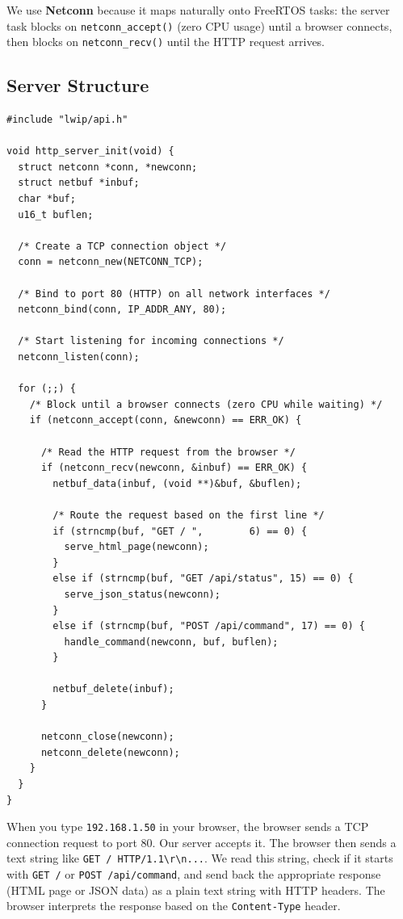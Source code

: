 \documentclass[11pt,a4paper]{article}
\begin{document}
We use \textbf{Netconn} because it maps naturally onto FreeRTOS tasks: the server task blocks on \texttt{netconn\_accept()} (zero CPU usage) until a browser connects, then blocks on \texttt{netconn\_recv()} until the HTTP request arrives.

\subsection{Server Structure}

\begin{lstlisting}
#include "lwip/api.h"

void http_server_init(void) {
  struct netconn *conn, *newconn;
  struct netbuf *inbuf;
  char *buf;
  u16_t buflen;

  /* Create a TCP connection object */
  conn = netconn_new(NETCONN_TCP);

  /* Bind to port 80 (HTTP) on all network interfaces */
  netconn_bind(conn, IP_ADDR_ANY, 80);

  /* Start listening for incoming connections */
  netconn_listen(conn);

  for (;;) {
    /* Block until a browser connects (zero CPU while waiting) */
    if (netconn_accept(conn, &newconn) == ERR_OK) {

      /* Read the HTTP request from the browser */
      if (netconn_recv(newconn, &inbuf) == ERR_OK) {
        netbuf_data(inbuf, (void **)&buf, &buflen);

        /* Route the request based on the first line */
        if (strncmp(buf, "GET / ",        6) == 0) {
          serve_html_page(newconn);
        }
        else if (strncmp(buf, "GET /api/status", 15) == 0) {
          serve_json_status(newconn);
        }
        else if (strncmp(buf, "POST /api/command", 17) == 0) {
          handle_command(newconn, buf, buflen);
        }

        netbuf_delete(inbuf);
      }

      netconn_close(newconn);
      netconn_delete(newconn);
    }
  }
}
\end{lstlisting}

\begin{infobox}
When you type \texttt{192.168.1.50} in your browser, the browser sends a TCP connection request to port 80. Our server accepts it. The browser then sends a text string like \texttt{GET / HTTP/1.1\textbackslash r\textbackslash n...}. We read this string, check if it starts with \texttt{GET /} or \texttt{POST /api/command}, and send back the appropriate response (HTML page or JSON data) as a plain text string with HTTP headers. The browser interprets the response based on the \texttt{Content-Type} header.
\end{infobox}
\end{document}
